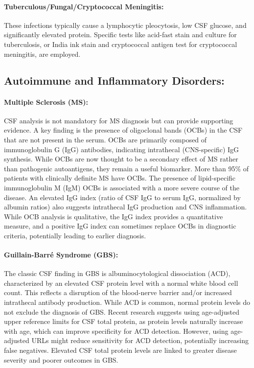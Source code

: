	\paragraph{Tuberculous/Fungal/Cryptococcal Meningitis:} These infections typically cause a lymphocytic pleocytosis, low CSF glucose, and significantly elevated protein. Specific tests like acid-fast stain and culture for tuberculosis, or India ink stain and cryptococcal antigen test for cryptococcal meningitis, are employed.
	
	\subsection*{Autoimmune and Inflammatory Disorders:}
	
	\paragraph{Multiple Sclerosis (MS):} CSF analysis is not mandatory for MS diagnosis but can provide supporting evidence. A key finding is the presence of oligoclonal bands (OCBs) in the CSF that are not present in the serum. OCBs are primarily composed of immunoglobulin G (IgG) antibodies, indicating intrathecal (CNS-specific) IgG synthesis. While OCBs are now thought to be a secondary effect of MS rather than pathogenic autoantigens, they remain a useful biomarker. More than 95\% of patients with clinically definite MS have OCBs. The presence of lipid-specific immunoglobulin M (IgM) OCBs is associated with a more severe course of the disease. An elevated IgG index (ratio of CSF IgG to serum IgG, normalized by albumin ratios) also suggests intrathecal IgG production and CNS inflammation. While OCB analysis is qualitative, the IgG index provides a quantitative measure, and a positive IgG index can sometimes replace OCBs in diagnostic criteria, potentially leading to earlier diagnosis.
	
	\paragraph{Guillain-Barré Syndrome (GBS):} The classic CSF finding in GBS is albuminocytological dissociation (ACD), characterized by an elevated CSF protein level with a normal white blood cell count. This reflects a disruption of the blood-nerve barrier and/or increased intrathecal antibody production. While ACD is common, normal protein levels do not exclude the diagnosis of GBS. Recent research suggests using age-adjusted upper reference limits for CSF total protein, as protein levels naturally increase with age, which can improve specificity for ACD detection. However, using age-adjusted URLs might reduce sensitivity for ACD detection, potentially increasing false negatives. Elevated CSF total protein levels are linked to greater disease severity and poorer outcomes in GBS.
	
